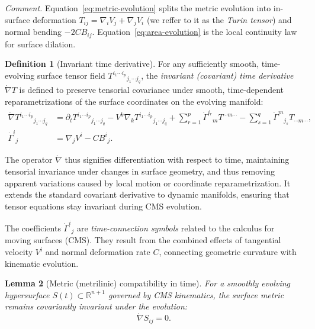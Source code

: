 \documentclass[11pt]{article}
\theoremstyle{definition}
\newtheorem{definition}{Definition}[section]
\theoremstyle{plain}
\newtheorem{lemma}[definition]{Lemma}
\theoremstyle{remark}
\begin{document}
\noindent\emph{Comment.}
Equation~\eqref{eq:metric-evolution} splits the metric evolution into in-surface deformation
$T_{ij}=\nabla_i V_j+\nabla_j V_i$ (we reffer to it as the \emph{Turin tensor}) and normal bending $-2C B_{ij}$.
Equation~\eqref{eq:area-evolution} is the local continuity law for surface dilation.


\begin{definition}[Invariant time derivative]\label{def:invariant-derivative}
For any sufficiently smooth, time-evolving surface tensor field 
$T^{i_1\cdots i_p}{}_{j_1\cdots j_q}$, 
the \emph{invariant (covariant) time derivative} $\dot{\nabla}T$ is defined to preserve tensorial covariance under smooth, time-dependent reparametrizations of the surface coordinates on the evolving manifold:
\begin{align}
\label{eq:inv-time-derivative}
\dot{\nabla}T^{i_1\cdots i_p}{}_{j_1\cdots j_q}
&=\partial_t T^{i_1\cdots i_p}{}_{j_1\cdots j_q} - V^{k}\nabla_{k}T^{i_1\cdots i_p}{}_{j_1\cdots j_q}
+ \sum_{r=1}^{p}\dot{\Gamma}^{i_r}{}_{m} T^{\cdots m\cdots}
- \sum_{s=1}^{q}\dot{\Gamma}^{m}{}_{j_s} T_{\cdots m\cdots},
\quad \nonumber\\
\dot{\Gamma}^{i}{}_{j}&=\nabla_{j}V^{i}-C B^{i}{}_{j}.
\end{align}

\noindent
The operator $\dot{\nabla}$ thus signifies differentiation with respect to time, maintaining tensorial invariance under changes in surface geometry, and thus removing apparent variations caused by local motion or coordinate reparametrization. It extends the standard covariant derivative to dynamic manifolds, ensuring that tensor equations stay invariant during CMS evolution.

The coefficients $\dot{\Gamma}^i{}_j$ are \emph{time-connection symbols} related to the calculus for moving surfaces (CMS). They result from the combined effects of tangential velocity $V^i$ and normal deformation rate $C$, connecting geometric curvature with kinematic evolution. %
\end{definition}

\begin{lemma}[Metric (metrilinic) compatibility in time]\label{lem:metric-compatibility}
For a smoothly evolving hypersurface $S(t)\subset\mathbb{R}^{n+1}$ governed by CMS kinematics,  
the surface metric remains covariantly invariant under the evolution:
\begin{equation}\label{eq:metric-compatibility}
\dot{\nabla}S_{ij}=0.
\end{equation}
\end{lemma}
\end{document}

